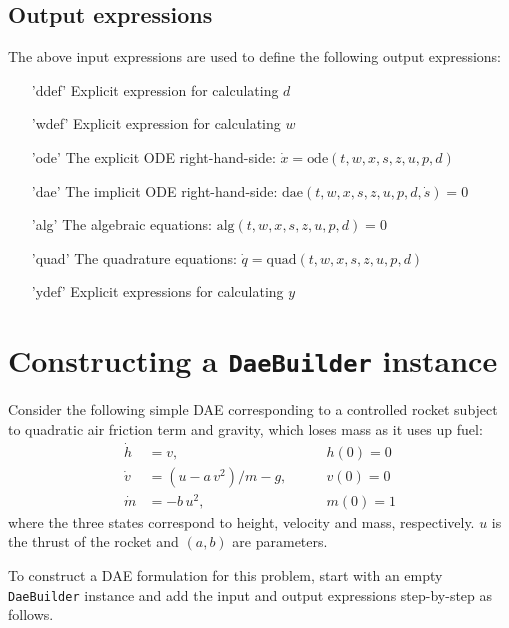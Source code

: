 \documentclass[a4paper,12pt]{book}
\begin{document}
\subsection*{Output expressions}
The above input expressions are used to define the following output expressions:
\begin{enumerate}
  \item['ddef'] Explicit expression for calculating $d$
  \item['wdef'] Explicit expression for calculating $w$
  \item['ode'] The explicit ODE right-hand-side:
    $\dot{x} = \text{ode}(t,w,x,s,z,u,p,d)$
  \item['dae'] The implicit ODE right-hand-side:
  $\text{dae}(t,w,x,s,z,u,p,d,\dot{s}) =0$
  \item['alg'] The algebraic equations:
    $\text{alg}(t,w,x,s,z,u,p,d) = 0$
  \item['quad'] The quadrature equations:
  $\dot{q} = \text{quad}(t,w,x,s,z,u,p,d)$
  \item['ydef'] Explicit expressions for calculating $y$
\end{enumerate}

\section{Constructing a \texttt{DaeBuilder} instance} \label{sec:daebuilder_syntax}
Consider the following simple DAE corresponding to a controlled rocket subject to
quadratic air friction term and gravity, which loses mass as it uses up fuel:
\begin{subequations}
\begin{align}
 \dot{h} &= v,                    \qquad &h(0) = 0 \\
 \dot{v} &= (u - a \, v^2)/m - g, \qquad &v(0) = 0 \\
 \dot{m} &= -b \, u^2,            \qquad &m(0) = 1
\end{align}
\end{subequations}
where the three states correspond to height, velocity and mass, respectively.
$u$ is the thrust of the rocket and $(a,b)$ are parameters.

To construct a DAE formulation for this problem, start with an empty
\texttt{DaeBuilder} instance and add the input and output expressions step-by-step
as follows.
\end{document}
